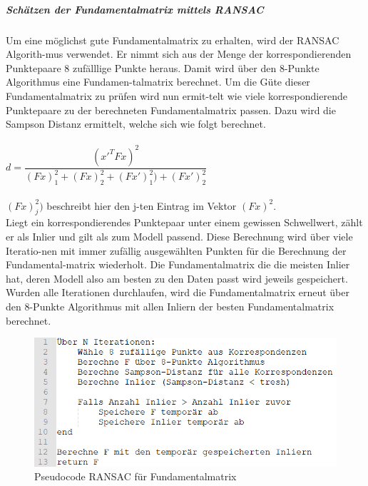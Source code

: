 \subparagraph{Schätzen der Fundamentalmatrix mittels RANSAC}
Um eine möglichst gute Fundamentalmatrix zu erhalten, wird der RANSAC Algorith-mus verwendet. Er nimmt sich aus der Menge der korrespondierenden Punktepaare 8 zufälllige Punkte heraus. Damit wird über den 8-Punkte Algorithmus eine Fundamen-talmatrix berechnet. Um die Güte dieser Fundamentalmatrix zu prüfen wird nun ermit-telt wie viele korrespondierende Punktepaare zu der berechneten Fundamentalmatrix passen. Dazu wird die Sampson Distanz ermittelt, welche sich wie folgt berechnet.
\\
\\
$d =  \dfrac{(x'^TFx)^2}{(Fx)^2_1 + (Fx)^2_2 + (Fx')^2_1) + (Fx')^2_2}$
\\
\\
$(Fx)^2_j)$ beschreibt hier den j-ten Eintrag im Vektor $(Fx)^2$.
\\
Liegt ein korrespondierendes Punktepaar unter einem gewissen Schwellwert, zählt er als Inlier und gilt als zum Modell passend. Diese Berechnung wird über viele Iteratio-nen mit immer zufällig ausgewählten Punkten für die Berechnung der Fundamental-matrix wiederholt. Die Fundamentalmatrix die die meisten Inlier hat, deren Modell also am besten zu den Daten passt wird jeweils gespeichert. Wurden alle Iterationen durchlaufen, wird die Fundamentalmatrix erneut über den 8-Punkte Algorithmus mit allen Inliern der besten Fundamentalmatrix berechnet.

\begin{figure}[ht]
    \centering
    \includegraphics[scale=0.75]{Figures/PseudocodeRansac.PNG}
    \caption{Pseudocode RANSAC für Fundamentalmatrix}
\end{figure}

